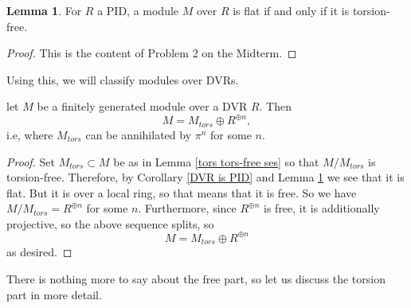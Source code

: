 \documentclass[12 pt]{article}
\theoremstyle{definition}
\newtheorem{lemma}[theorem]{Lemma}
\begin{document}
\begin{lemma} For $R$ a PID, a module $M$ over $R$ is flat if and only if it is torsion-free.
\label{PID means flat=tors free}
\end{lemma}
\begin{proof} This is the content of Problem 2 on the Midterm.
\end{proof}

Using this, we will classify modules over DVRs.

\begin{proposition} let $M$ be a finitely generated module over a DVR $R$. Then
\[M=M_{tors}\oplus R^{\oplus n},\] i.e, where $M_{tors}$ can be annihilated by $\pi^n$ for some $n$.
\end{proposition}
\begin{proof}
Set $M_{tors} \subset M$ be as in Lemma \ref{tors tors-free ses} so that $M/M_{tors}$ is torsion-free. Therefore, by Corollary \ref{DVR is PID} and Lemma \ref{PID means flat=tors free} we see that it is flat. But it is over a local ring, so that means that it is free. So we have $M/M_{tors}=R^{\oplus n}$ for some $n$. Furthermore, since $R^{\oplus n}$ is free, it is additionally projective, so the above sequence splits, so
\[M=M_{tors} \oplus R^{\oplus n}\]
as desired.
\end{proof}

There is nothing more to say about the free part, so let us discuss the torsion part in more detail.
\end{document}
